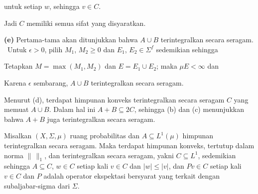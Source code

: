 {\noindent untuk setiap $w$, sehingga $v\in C$.

Jadi $C$ memiliki semua sifat yang disyaratkan.

\medskip

{\bf (e)} Pertama-tama akan ditunjukkan bahwa $A\cup B$ terintegralkan secara
seragam. \Prf\ Untuk $\epsilon>0$, pilih $M_1$, $M_2\ge 0$ dan
$E_1$, $E_2\in\Sigma^f$ sedemikian sehingga



\noindent Tetapkan $M=\max(M_1,M_2)$ dan $E=E_1\cup E_2$; maka $\mu E<\infty$ dan


\noindent Karena $\epsilon$ sembarang, $A\cup B$ terintegralkan secara
seragam. \Qed

Menurut (d), terdapat himpunan konveks terintegralkan secara seragam $C$ yang
memuat $A\cup B$. Dalam hal ini $A+B\subseteq 2C$, sehingga (b) dan (c)
menunjukkan bahwa $A+B$ juga terintegralkan secara seragam.
}%

 Misalkan $(X,\Sigma,\mu)$ ruang probabilitas dan
$A\subseteq L^1(\mu)$ himpunan terintegralkan secara seragam. Maka terdapat
himpunan konveks, tertutup dalam norma $\|\,\|_1$, dan terintegralkan secara
seragam, yakni $C\subseteq L^1$,
sedemikian sehingga $A\subseteq C$, $w\in C$ setiap kali $v\in C$ dan
$|w|\le|v|$, dan $Pv\in C$ setiap kali $v\in C$ dan $P$ adalah operator
ekspektasi bersyarat yang terkait dengan subaljabar-sigma dari $\Sigma$.


